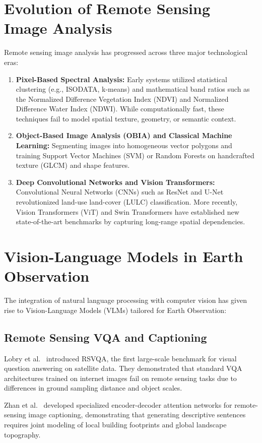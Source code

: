\documentclass[12pt,a4paper]{report}
\begin{document}
\section{Evolution of Remote Sensing Image Analysis}
Remote sensing image analysis has progressed across three major technological eras:
\begin{enumerate}
    \item \textbf{Pixel-Based Spectral Analysis:} Early systems utilized statistical clustering (e.g., ISODATA, k-means) and mathematical band ratios such as the Normalized Difference Vegetation Index (NDVI) and Normalized Difference Water Index (NDWI). While computationally fast, these techniques fail to model spatial texture, geometry, or semantic context.
    \item \textbf{Object-Based Image Analysis (OBIA) and Classical Machine Learning:} Segmenting images into homogeneous vector polygons and training Support Vector Machines (SVM) or Random Forests on handcrafted texture (GLCM) and shape features.
    \item \textbf{Deep Convolutional Networks and Vision Transformers:} Convolutional Neural Networks (CNNs) such as ResNet and U-Net revolutionized land-use land-cover (LULC) classification. More recently, Vision Transformers (ViT) and Swin Transformers have established new state-of-the-art benchmarks by capturing long-range spatial dependencies.
\end{enumerate}

\section{Vision-Language Models in Earth Observation}
The integration of natural language processing with computer vision has given rise to Vision-Language Models (VLMs) tailored for Earth Observation:

\subsection{Remote Sensing VQA and Captioning}
Lobry et al.~\cite{rsvqa} introduced RSVQA, the first large-scale benchmark for visual question answering on satellite data. They demonstrated that standard VQA architectures trained on internet images fail on remote sensing tasks due to differences in ground sampling distance and object scales. 

Zhan et al.~\cite{rs_caption} developed specialized encoder-decoder attention networks for remote-sensing image captioning, demonstrating that generating descriptive sentences requires joint modeling of local building footprints and global landscape topography.
\end{document}
